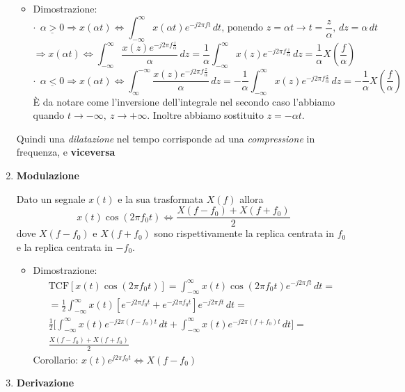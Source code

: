 \documentclass[
  paper=a4,
  ,captions=tableheading
]{scrartcl}
\providecommand{\tightlist}{%
  \setlength{\itemsep}{0pt}\setlength{\parskip}{0pt}}
\begin{document}
\begin{enumerate}
  \begin{itemize}
  \tightlist
  \item
    Dimostrazione: \[
    \cdot \ \ \underline{\alpha > 0} \Rightarrow x(\alpha t) \Longleftrightarrow \int_{-\infty}^{\infty} x(\alpha t) e^{-j2\pi ft} \,dt \text{, ponendo } z=\alpha t \to t = \frac{z}{\alpha}, \,dz = \alpha \,dt 
    \] \[
    \Rightarrow x(\alpha t) \Longleftrightarrow \int_{-\infty}^{\infty} \frac{x(z) e^{-j2\pi f \frac{z}{\alpha}}}{\alpha} \,dz = \frac{1}{\alpha}\int_{-\infty}^{\infty} x(z) e^{-j2\pi f \frac{z}{\alpha}} \,dz = \frac{1}{\alpha} X(\frac{f}{\alpha})
    \] \[
    \cdot \ \ \underline{\alpha < 0} \Rightarrow x(\alpha t) \Longleftrightarrow \int_{\infty}^{-\infty} \frac{x(z) e^{-j2\pi f \frac{z}{\alpha}}}{\alpha} \,dz = -\frac{1}{\alpha}\int_{-\infty}^{\infty} x(z) e^{-j2\pi f \frac{z}{\alpha}} \,dz = -\frac{1}{\alpha} X(\frac{f}{\alpha})
    \] È da notare come l'inversione dell'integrale nel secondo caso
    l'abbiamo quando \(t \to -\infty, \ z \to +\infty\). Inoltre abbiamo
    sostituito \(z=-\alpha t\).
  \end{itemize}

  Quindi una \emph{dilatazione} nel tempo corrisponde ad una
  \emph{compressione} in frequenza, e \textbf{viceversa} \newpage
\item
  \textbf{Modulazione}

  Dato un segnale \(x(t)\) e la sua trasformata \(X(f)\) allora \[
  x(t)\cos(2\pi f_{0}t) \Longleftrightarrow \frac{X(f-f_0)+X(f+f_0)}{2}
  \] dove \(X(f-f_0)\) e \(X(f+f_0)\) sono rispettivamente la replica
  centrata in \(f_0\) e la replica centrata in \(-f_0\).

  \begin{itemize}
  \tightlist
  \item
    Dimostrazione: \begin{gather*}
    \text{TCF}[x(t)\cos(2\pi f_{0}t)] = \int_{-\infty}^{\infty} x(t)\cos(2\pi f_{0}t)  e^{-j2\pi ft} \,dt = 
    \\
    = \frac{1}{2} \int_{-\infty}^{\infty} x(t) [e^{-j2\pi f_0 t}+ e^{-j2\pi f_0 t}]e^{-j2\pi ft} \,dt =\\ \frac{1}{2}\Big[\int_{-\infty}^{\infty}x(t)  e^{-j2\pi (f-f_0)t}\,dt + \int_{-\infty}^{\infty}x(t)  e^{-j2\pi (f+f_0)t}\,dt  \Big] =
    \\
    \frac{X(f-f_0)+X(f+f_0)}{2}
    \end{gather*} Corollario:
    \(x(t)e^{j2\pi f_{0}t} \Longleftrightarrow X(f-f_0)\)
  \end{itemize}
\item
  \textbf{Derivazione}


\end{enumerate}
\end{document}
